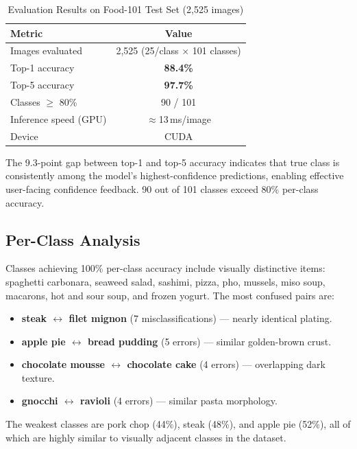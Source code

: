 \documentclass[fleqn,10pt]{SelfArx}
\begin{document}
\begin{table}[!htb]
\centering
\caption{Evaluation Results on Food-101 Test Set (2,525 images)}
\label{tab:eval_results}
\small
\begin{tabular}{@{}lc@{}}
\toprule
\textbf{Metric}       & \textbf{Value} \\
\midrule
Images evaluated      & 2,525 (25/class $\times$ 101 classes) \\
Top-1 accuracy        & \textbf{88.4\%} \\
Top-5 accuracy        & \textbf{97.7\%} \\
Classes $\geq$ 80\%   & 90 / 101 \\
Inference speed (GPU) & $\approx$13\,ms/image \\
Device                & CUDA \\
\bottomrule
\end{tabular}
\end{table}

The 9.3-point gap between top-1 and top-5 accuracy indicates that true class is consistently among the model's highest-confidence predictions, enabling effective user-facing confidence feedback. 90 out of 101 classes exceed 80\% per-class accuracy.

\subsection{Per-Class Analysis}

Classes achieving 100\% per-class accuracy include visually distinctive items: spaghetti carbonara, seaweed salad, sashimi, pizza, pho, mussels, miso soup, macarons, hot and sour soup, and frozen yogurt. The most confused pairs are:
\begin{itemize}[noitemsep]
    \item \textbf{steak $\leftrightarrow$ filet mignon} (7 misclassifications) — nearly identical plating.
    \item \textbf{apple pie $\leftrightarrow$ bread pudding} (5 errors) — similar golden-brown crust.
    \item \textbf{chocolate mousse $\leftrightarrow$ chocolate cake} (4 errors) — overlapping dark texture.
    \item \textbf{gnocchi $\leftrightarrow$ ravioli} (4 errors) — similar pasta morphology.
\end{itemize}
The weakest classes are pork chop (44\%), steak (48\%), and apple pie (52\%), all of which are highly similar to visually adjacent classes in the dataset.
\end{document}
